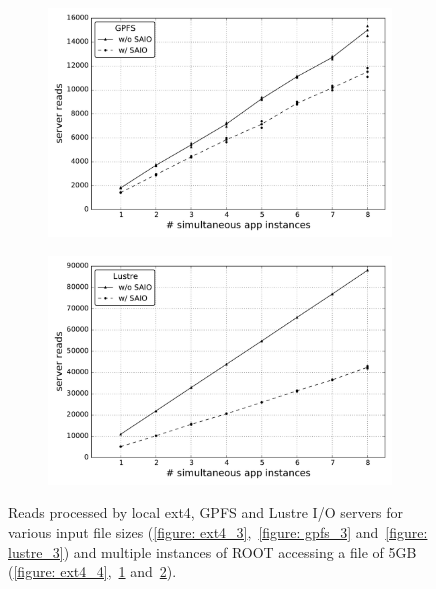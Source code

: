 \begin{figure}[!htb]
\begin{subfigure}[b]{0.32\textwidth}
    \includegraphics[width=\textwidth]{figures/SC2015/ROOT/cluster/multiple_instances/reads_simult_instance_gpfs_test_cluster}
    \caption{\textit{}}
    \label{figure: gpfs_4}
  \end{subfigure}
  \begin{subfigure}[b]{0.32\textwidth}
    \centering
    \includegraphics[width=\textwidth]{figures/SC2015/ROOT/cluster/multiple_instances/reads_multiple_simult_procs_Lustre_testcluster}
    \caption{\textit{}}
    \label{figure: lustre_4}
  \end{subfigure}
  \caption{Reads processed by local ext4, GPFS and Lustre I/O servers for various input file sizes (\ref{figure: ext4_3},~\ref{figure: gpfs_3} and~\ref{figure: lustre_3}) and multiple instances of ROOT accessing a file of 5GB (\ref{figure: ext4_4},~\ref{figure: gpfs_4} and~\ref{figure: lustre_4}).}
  \label{figure: read}
\end{figure}

